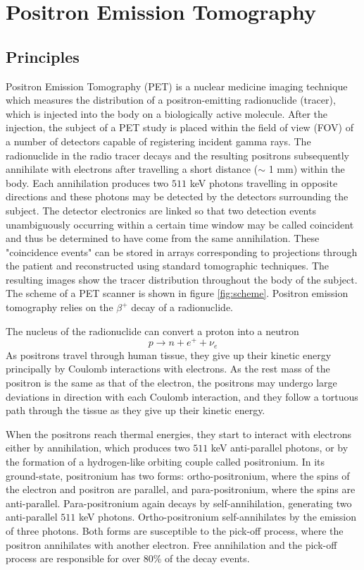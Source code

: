 \section{Positron Emission Tomography}
\subsection{Principles}
Positron Emission Tomography (\ac{PET}) is a nuclear medicine imaging technique which measures the distribution of a positron-emitting radionuclide (tracer), which is injected into the body on a biologically active molecule.
After the injection, the subject of a \ac{PET} study is placed within the field of view (\ac{FOV}) of a number of detectors capable of registering incident gamma rays. The radionuclide in the radio tracer decays and the resulting positrons subsequently annihilate with electrons after travelling a short distance ($\sim$ 1 mm) within the body. Each annihilation produces two $511$ keV photons travelling in opposite directions and these photons may be detected by the detectors surrounding the subject. The detector electronics are linked so that two detection events unambiguously occurring within a certain time window may be called coincident and thus be determined to have come from the same annihilation. These "coincidence events" can be stored in arrays corresponding to projections through the patient and reconstructed using standard tomographic techniques. The resulting images show the tracer distribution throughout the body of the subject. The scheme of a PET scanner is shown in figure \ref{fig:scheme}.
Positron emission tomography relies on the $\beta ^{+}$ decay of a radionuclide.

The nucleus of the radionuclide can convert a proton into a neutron 
\begin{displaymath}
p\rightarrow n + e^{+} + \nu _{e}
\end{displaymath}
As positrons travel through human tissue, they give up their kinetic energy principally by Coulomb interactions with electrons. As the rest mass of the positron is the same as that of the electron, the positrons may undergo large deviations in direction with each Coulomb interaction, and they follow a tortuous path through the tissue as they give up their kinetic energy.

When the positrons reach thermal energies, they start to interact with electrons either by annihilation, which produces two $511$ keV anti-parallel photons, or by the formation of a hydrogen-like orbiting couple called positronium. In its ground-state, positronium has two forms: ortho-positronium, where the spins of the electron and positron are parallel, and para-positronium, where the spins are anti-parallel. Para-positronium again decays by self-annihilation, generating two anti-parallel $511$ keV photons. Ortho-positronium self-annihilates by the emission of three photons. Both forms are susceptible to the pick-off process, where the positron annihilates with another electron. Free annihilation and the pick-off process are responsible for over $80\%$ of the decay events.

